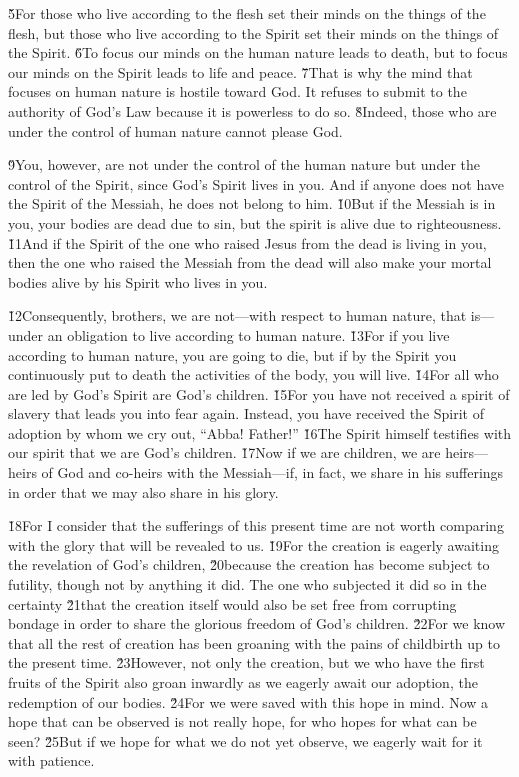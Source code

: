 \v{5}For those who live according to the flesh set their minds on the things of the flesh, but those who live according to the Spirit set their minds on the things of the Spirit. \v{6}To focus our minds on the human nature leads to death, but to focus our minds on the Spirit leads to life and peace. \v{7}That is why the mind that focuses on human nature is hostile toward God. It refuses to submit to the authority of God's Law because it is powerless to do so. \v{8}Indeed, those who are under the control of human nature cannot please God.

\v{9}You, however, are not under the control of the human nature but under the control of the Spirit, since God's Spirit lives in you. And if anyone does not have the Spirit of the Messiah, he does not belong to him. \v{10}But if the Messiah is in you, your bodies are dead due to sin, but the spirit is alive due to righteousness. \v{11}And if the Spirit of the one who raised Jesus from the dead is living in you, then the one who raised the Messiah from the dead will also make your mortal bodies alive by his Spirit who lives in you.

\v{12}Consequently, brothers, we are not---with respect to human nature, that is---under an obligation to live according to human nature. \v{13}For if you live according to human nature, you are going to die, but if by the Spirit you continuously put to death the activities of the body, you will live. \v{14}For all who are led by God's Spirit are God's children. \v{15}For you have not received a spirit of slavery that leads you into fear again. Instead, you have received the Spirit of adoption by whom we cry out, ``Abba! Father!'' \v{16}The Spirit himself testifies with our spirit that we are God's children. \v{17}Now if we are children, we are heirs---heirs of God and co-heirs with the Messiah---if, in fact, we share in his sufferings in order that we may also share in his glory.

\v{18}For I consider that the sufferings of this present time are not worth comparing with the glory that will be revealed to us. \v{19}For the creation is eagerly awaiting the revelation of God's children, \v{20}because the creation has become subject to futility, though not by anything it did. The one who subjected it did so in the certainty \v{21}that the creation itself would also be set free from corrupting bondage in order to share the glorious freedom of God's children. \v{22}For we know that all the rest of creation has been groaning with the pains of childbirth up to the present time. \v{23}However, not only the creation, but we who have the first fruits of the Spirit also groan inwardly as we eagerly await our adoption, the redemption of our bodies. \v{24}For we were saved with this hope in mind. Now a hope that can be observed is not really hope, for who hopes for what can be seen? \v{25}But if we hope for what we do not yet observe, we eagerly wait for it with patience.

